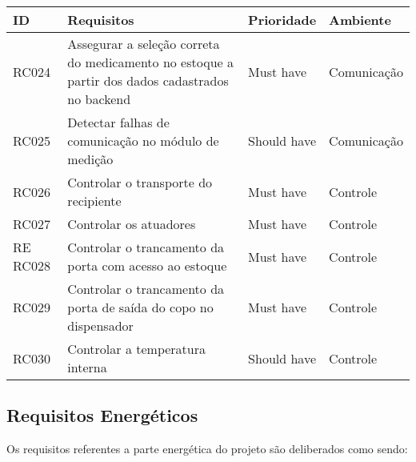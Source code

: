 \begin{table}[H]
    \centering
	\begin{adjustbox}{max width = \textwidth}
        \begin{tabular}{|L{1.5cm}|L{8.5cm}|C{2.5cm}|C{3.5cm}|}
        \hline
        \textbf{ID} & \textbf{Requisitos} & \textbf{Prioridade} & \textbf{Ambiente} \\ \hline
        RC024 & Assegurar a seleção correta do medicamento no estoque a partir dos dados cadastrados no backend & Must have & Comunicação\\ \hline
        RC025 & Detectar falhas de comunicação no módulo de medição & Should have & Comunicação\\ \hline
        RC026 & Controlar o transporte do recipiente & Must have & Controle \\ \hline
        RC027 & Controlar os atuadores & Must have & Controle \\ \hline
        RE
        RC028 & Controlar o trancamento da porta com acesso ao estoque & Must have & Controle \\ \hline
        RC029 & Controlar o trancamento da porta de saída do copo no dispensador & Must have & Controle \\ \hline
        RC030 & Controlar a temperatura interna & Should have & Controle \\ \hline
        \end{tabular}
	\end{adjustbox}    
\end{table}

\subsection{Requisitos Energéticos}

Os requisitos referentes a parte energética do projeto são deliberados como sendo:

